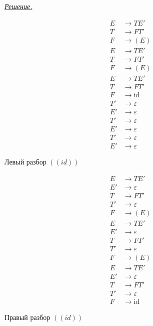 \documentclass[10pt]{article}
\newcounter{pr} \setcounter{pr}{0}
\newenvironment{sol}
  {\par
   {\itshape \underline{Решение.}}}
  {}
\newcommand{\eps}{\varepsilon}
\newcommand{\id}{\mathrm{id}}
\begin{document}
\begin{pr}
\begin{sol}
\begin{multicols}{3}
        \begin{minipage}{.9\linewidth}
          \captionsetup{type=figure}
          \centering
          \begin{align*}
            E & \to TE' \\
            T & \to FT' \\
            F & \to (E) \\
            E & \to TE' \\
            T & \to FT' \\
            F & \to (E) \\
            E & \to TE' \\
            T & \to FT' \\
            F & \to \id \\
            T' & \to \eps \\
            E' &  \to \eps \\
            T' & \to \eps \\
            E' & \to \eps \\
            T' & \to \eps \\
            E' & \to \eps
          \end{align*}
          \caption{Левый разбор $((id))$}
          \label{fig:left}
        \end{minipage}

        \columnbreak

        \begin{minipage}{.9\linewidth}
          \captionsetup{type=figure}
          \centering
          \begin{align*}
            E & \to TE' \\
            E' & \to \eps \\
            T & \to FT' \\
            T' & \to \eps \\
            F & \to (E) \\
            E & \to TE' \\
            E' & \to \eps \\
            T & \to FT' \\
            T' & \to \eps \\
            F & \to (E) \\
            E & \to TE' \\
            E' & \to \eps \\
            T & \to FT' \\
            T' & \to \eps \\
            F & \to \id
          \end{align*}
          \caption{Правый разбор $((id))$}
          \label{fig:right}
        \end{minipage}
      \end{multicols}
    \end{sol}
  \end{pr}
\end{document}
